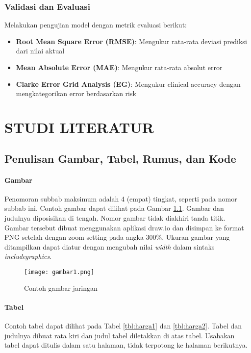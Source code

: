 \documentclass[12pt,a4paper,oneside]{book}
\begin{document}
\subsection{Validasi dan Evaluasi}

Melakukan pengujian model dengan metrik evaluasi berikut:

\begin{itemize}
    \item \textbf{Root Mean Square Error (RMSE)}: Mengukur rata-rata deviasi prediksi dari nilai aktual
    \item \textbf{Mean Absolute Error (MAE)}: Mengukur rata-rata absolut error
    \item \textbf{Clarke Error Grid Analysis (EG)}: Mengukur clinical accuracy dengan mengkategorikan error berdasarkan risk
\end{itemize}
\chapter{STUDI LITERATUR}
\section{Penulisan Gambar, Tabel, Rumus, dan Kode}
\lipsum[1]

\subsubsection{Gambar}
Penomoran subbab maksimum adalah 4 (empat) tingkat, seperti pada nomor subbab ini. Contoh gambar dapat dilihat pada Gambar \ref{gambar:jaringan}. Gambar dan judulnya diposisikan di tengah. Nomor gambar tidak diakhiri tanda titik. Gambar tersebut dibuat menggunakan aplikasi draw.io dan disimpan ke format PNG setelah dengan zoom setting pada angka 300\%. Ukuran gambar yang ditampilkan dapat diatur dengan mengubah nilai \textit{width} dalam sintaks \textit{includegraphics}.

\begin{figure}[t] %
	\centering
  \captionsetup{justification=centering}
    	\texttt{[image: gambar1.png]}
	\caption{Contoh gambar jaringan}
	\label{gambar:jaringan}
\end{figure}


\subsubsection{Tabel}
Contoh tabel dapat dilihat pada Tabel \ref{tbl:harga1} dan \ref{tbl:harga2}. Tabel dan judulnya dibuat rata kiri dan judul tabel diletakkan di atas tabel. Usahakan tabel dapat ditulis dalam satu halaman, tidak terpotong ke halaman berikutnya.
\end{document}
